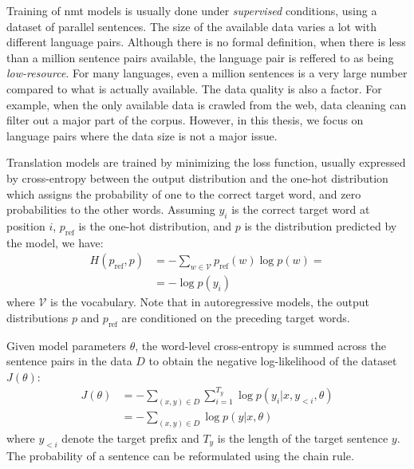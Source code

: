 Training of \ac{nmt} models is usually done under \emph{supervised} conditions,
using a dataset of parallel sentences. The size of the available data varies a
lot with different language pairs. Although there is no formal definition, when
there is less than a million sentence pairs available, the language pair is
reffered to as being \emph{low-resource}. For many languages, even a million
sentences is a very large number compared to what is actually available. The
data quality is also a factor. For example, when the only available data is
crawled from the web, data cleaning can filter out a major part of the
corpus. However, in this thesis, we focus on language pairs where the data size
is not a major issue.

Translation models are trained by minimizing the loss function, usually
expressed by cross-entropy between the output distribution and the one-hot
distribution which assigns the probability of one to the correct target word,
and zero probabilities to the other words. Assuming $y_i$ is the correct target
word at position $i$, $p_{\text{ref}}$ is the one-hot distribution, and $p$ is
the distribution predicted by the model, we have:
%
\begin{equation}
  \begin{split}
    H(p_{\text{ref}}, p) &=  - \sum_{w \in \mathcal{V}} p_{\text{ref}}(w) \log p(w) = \\
    &=  - \log p(y_i)
  \end{split}
\end{equation}
%
where $\mathcal{V}$ is the vocabulary. Note that in autoregressive models, the
output distributions $p$ and $p_{\text{ref}}$ are conditioned on the preceding
target words.

Given model parameters $\theta$, the word-level cross-entropy is summed across
the sentence pairs in the data $D$ to obtain the negative log-likelihood of the
dataset $J(\theta)$:
%
\begin{equation}
  \begin{split}
  J(\theta) &= - \sum_{(x, y) \in D} \sum_{i = 1}^{T_y} \log p(y_i | x, y_{<i}, \theta) \\
  &= - \sum_{(x, y) \in D} \log p(y | x, \theta)
  \end{split} \label{eq:loss}
\end{equation}
%
where $y_{<i}$ denote the target prefix and $T_{y}$ is the length of the target
sentence $y$. The probability of a sentence can be reformulated using the chain
rule.

